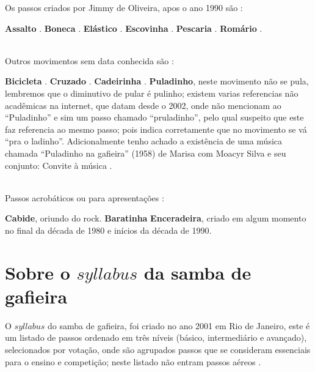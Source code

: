 Os passos criados por Jimmy de Oliveira, apos o ano 1990 são \cite{sambafunkeadoJimmyDeOliveiraPart1}: 
\begin{tasks}
\task \textbf{Assalto} . 
\task \textbf{Boneca} .
\task \textbf{Elástico} .
\task \textbf{Escovinha} .
\task \textbf{Pescaria} .
\task \textbf{Romário} .
\end{tasks}~\\



Outros movimentos sem data conhecida são \cite[pp. 143]{perna2002samba}:
\begin{tasks}
\task \textbf{Bicicleta} .
\task \textbf{Cruzado} .
\task \textbf{Cadeirinha} .
\task \textbf{Puladinho}, 
neste movimento não se pula, lembremos que o diminutivo de pular é pulinho; 
existem varias referencias não acadêmicas na internet, que datam desde o 2002,
onde não mencionam ao ``Puladinho'' e sim um passo chamado ``pruladinho'', 
pelo qual suspeito que este faz referencia ao mesmo passo;
pois indica corretamente que no movimento se vá ``pra o ladinho''.
Adicionalmente tenho achado a existência de uma música chamada 
``Puladinho na gafieira'' (1958)  de  Marisa com Moacyr Silva e seu conjunto: Convite à música \cite{puladinhogafieiramusic}.
\end{tasks}~\\


Passos acrobáticos ou para apresentações \cite[pp. 142-143]{perna2002samba}:
\begin{tasks}
\task \textbf{Cabide},  oriundo do rock.
\task \textbf{Baratinha} 
\task \textbf{Enceradeira},  criado em algum momento no final da década de 1980 e inícios da década de 1990.
\end{tasks}


\section{Sobre o $syllabus$ da samba de gafieira}

O $syllabus$  do samba de gafieira, foi criado no ano 2001 em Rio de Janeiro,
este é um listado de passos ordenado em três níveis (básico, intermediário e avançado),
selecionados por votação,
onde são agrupados passos que se consideram essenciais para o ensino e competição;
neste listado não entram passos aéreos \cite[pp. 144]{perna2002samba}.


